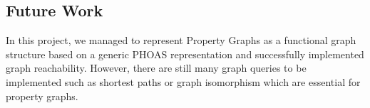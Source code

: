 \subsection{Future Work}
\label{subsec:future}

In this project, we managed to represent Property Graphs as a functional graph structure
based on a generic PHOAS representation and successfully implemented graph reachability. However, there are still many graph queries to be implemented such as shortest paths or graph isomorphism which are essential for property graphs.
